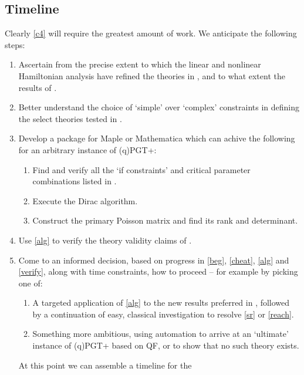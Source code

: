 \documentclass[twoside]{report}
\begin{document}
\begin{multicols}{2}
\subsection{Timeline}
Clearly \ref{c4} will require the greatest amount of work. We anticipate the following steps:
\begin{enumerate}[resume]
  \item\label{beg} Ascertain from \cite{1999IJMPD...8..459Y,2002IJMPD..11..747Y,1987PhRvD..35.3748B} the precise extent to which the linear and nonlinear Hamiltonian analysis have refined the theories in \cite{1980PhRvD..21.3269S}, and to what extent the results of \cite{2019PhRvD..99f4001L,Lin2}.
  \item\label{cheat} Better understand the choice of `simple' over `complex' constraints in defining the select theories tested in \cite{1999IJMPD...8..459Y,2002IJMPD..11..747Y}.
  \item\label{alg} Develop a package for Maple or Mathematica which can achive the following for an arbitrary instance of (q)PGT+:
    \begin{enumerate}
      \item Find and verify all the `if constraints' and critical parameter combinations listed in \cite{1983PhRvD..28.2455B,2002IJMPD..11..747Y}.
      \item Execute the Dirac algorithm.
      \item Construct the primary Poisson matrix and find its rank and determinant.
    \end{enumerate}
  \item\label{verify} Use \ref{alg} to verify the theory validity claims of \cite{1999IJMPD...8..459Y,2002IJMPD..11..747Y}.
  \item Come to an informed decision, based on progress in \ref{beg}, \ref{cheat}, \ref{alg} and \ref{verify}, along with time constraints, how to proceed -- for example by picking one of:
    \begin{enumerate}
      \item A targeted application of \ref{alg} to the new results preferred in \cite{paper-2,2019PhRvD..99f4001L,Lin2}, followed by a continuation of easy, classical investigation to resolve \ref{sr} or \ref{reach}.
      \item Something more ambitious, using automation to arrive at an `ultimate' instance of (q)PGT+ based on QF, or to show that no such theory exists.
    \end{enumerate}
    At this point we can assemble a timeline for the 

\end{enumerate}
\end{multicols}
\end{document}
